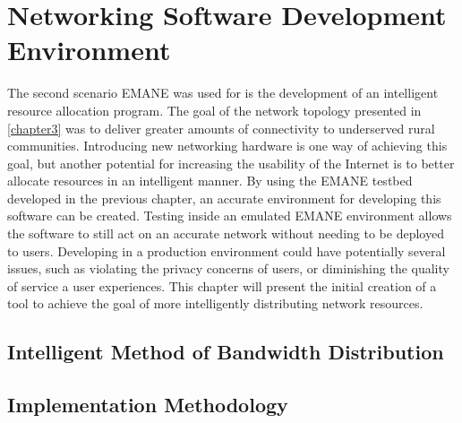 \chapter{Networking Software Development Environment}
\label{chapter4}
The second scenario EMANE was used for is the development of an intelligent resource allocation program.
The goal of the network topology presented in \ref{chapter3} was to deliver greater amounts of connectivity to underserved rural communities.
Introducing new networking hardware is one way of achieving this goal, but another potential for increasing the usability of the Internet is to better allocate resources in an intelligent manner.
By using the EMANE testbed developed in the previous chapter, an accurate environment for developing this software can be created.
Testing inside an emulated EMANE environment allows the software to still act on an accurate network without needing to be deployed to users.
Developing in a production environment could have potentially several issues, such as violating the privacy concerns of users, or diminishing the quality of service a user experiences.
This chapter will present the initial creation of a tool to achieve the goal of more intelligently distributing network resources.

\section{Intelligent Method of Bandwidth Distribution}


\section{Implementation Methodology}


